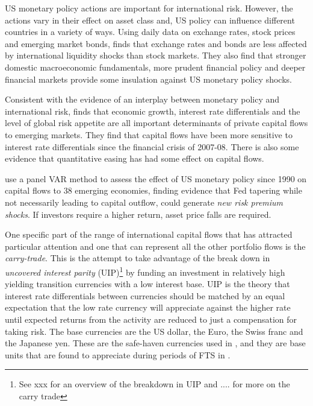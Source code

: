\documentclass[12pt, a4paper, oneside]{article} %
\begin{document}
US monetary policy actions are important for international risk.  However, the actions vary in their effect on asset class and, US policy can influence different countries in a variety of ways.  Using daily data on exchange rates, stock prices and emerging market bonds, \citet{Tapering} finds that exchange rates and bonds are less affected by international liquidity shocks than stock markets.  They also find that stronger domestic macroeconomic fundamentals, more prudent financial policy and deeper financial markets provide some insulation against US monetary policy shocks. 

Consistent with the evidence of an interplay between monetary policy and international risk, \citet{Ahmed2014} finds that economic growth, interest rate differentials and the level of global risk appetite are all important determinants of private capital flows to emerging markets.  They find that capital flows have been more sensitive to interest rate differentials since the financial crisis of 2007-08. There is also some evidence that quantitative easing has had some effect on capital flows. 

\citet{IMFLatam} use a panel VAR method to assess the effect of US monetary policy since 1990 on capital flows to 38 emerging economies, finding evidence that Fed tapering while not necessarily leading to capital outflow, could generate \emph{new risk premium shocks}.   If investors require a higher return, asset price falls are required. 

One specific part of the range of international capital flows that has attracted particular attention and one  that can represent all the other portfolio flows is the \emph{carry-trade}.  This is the attempt to take advantage of the break down in \emph{uncovered interest parity} (UIP)\footnote{See xxx for an overview of the breakdown in UIP and .... for more on the carry trade} by funding an investment in relatively high yielding transition currencies with a low interest base.  UIP is the theory that interest rate differentials between currencies should be matched by an equal expectation that the low rate currency will appreciate against the higher rate until expected returns from the activity are reduced to just a compensation for taking risk. The base currencies are the US dollar, the Euro, the Swiss franc and the Japanese yen.  These are the safe-haven currencies used in \citet{HabibStracca}, and they are base units that are found to appreciate during periods of FTS in \citet{FTS}. 
\end{document}
